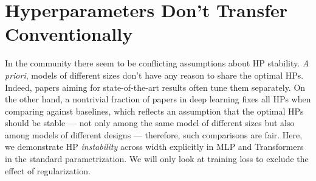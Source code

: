 \documentclass{article}
\theoremstyle{definition}
\begin{document}
\section{Hyperparameters Don't Transfer Conventionally}
\label{sec:sp_fails}

  

In the community there seem to be conflicting assumptions about HP stability.
\emph{A priori}, models of different sizes don't have any reason to share the optimal HPs.
Indeed, papers aiming for state-of-the-art results often tune them separately.
On the other hand, a nontrivial fraction of papers in deep learning fixes all HPs when comparing against baselines, which reflects an assumption that the optimal HPs should be stable --- not only among the same model of different sizes but also among models of different designs --- therefore, such comparisons are fair.
Here, we demonstrate HP \emph{instability}  across width explicitly in MLP and Transformers in the standard parametrization.
We will only look at training loss to exclude the effect of regularization.
\end{document}

